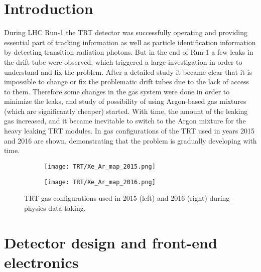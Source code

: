 \section{Introduction}
\label{sec:TRT_intro}

During LHC Run-1 the TRT detector was successfully operating and providing essential part of tracking information 
as well as particle identification information by detecting transition radiation photons. But in the end of Run-1 
a few leaks in the drift tube were observed, which triggered a large investigation in order to understand and fix the problem. 
After a detailed study it became clear that it is impossible to change or fix the problematic drift tubes 
due to the lack of access to them. Therefore some changes in the gas system were done in order to minimize the leaks, 
and study of possibility of using Argon-based gas mixtures (which are significantly cheaper) started. 
With time, the amount of the leaking gas increased, and it became inevitable to switch to the Argon mixture 
for the heavy leaking TRT modules. In  gas configurations of the TRT used 
in years 2015 and 2016 are shown, demonstrating that the problem is gradually developing with time.

\begin{figure}
\centering
\begin{subfigure}{.5\textwidth}
  \centering
  \texttt{[image: TRT/Xe\_Ar\_map\_2015.png]}
  \label{fig:sub1}
\end{subfigure}%
\begin{subfigure}{.5\textwidth}
  \centering
  \texttt{[image: TRT/Xe\_Ar\_map\_2016.png]}
  \label{fig:sub2}
\end{subfigure}
\caption{TRT gas configurations used in 2015 (left) and 2016 (right) during physics data taking.}
\label{fig:mixed_condition_2015_2016}
\end{figure}

\section{Detector design and front-end electronics}
\label{sec:trt_straw_hw}

